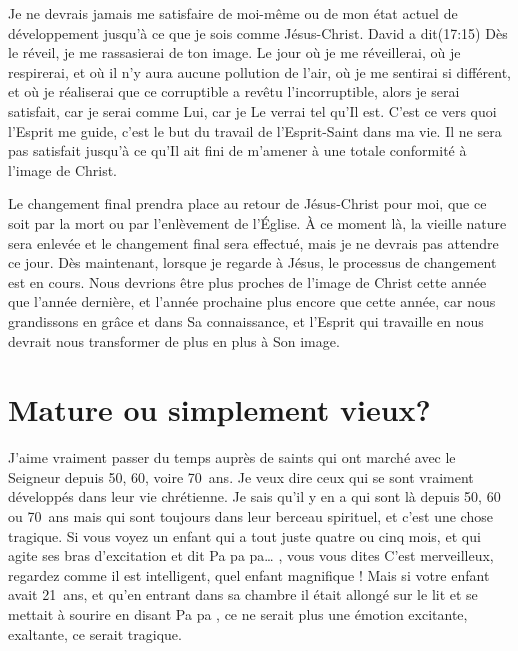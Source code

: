Je ne devrais jamais me satisfaire de moi-même ou de mon état actuel
 de développement jusqu'à ce que je sois comme Jésus-Christ.
 David a dit\frcolon{}(17:15)
 \Og Dès le réveil, je me rassasierai de ton image. \Fg{}
 Le jour où je me réveillerai, où je respirerai,
 et où il n'y aura aucune pollution de l'air, où je me sentirai si différent,
 et où je réaliserai que ce corruptible a revêtu l'incorruptible,
 alors je serai satisfait, car je serai comme Lui, car je Le verrai
 tel qu'Il est. C'est ce vers quoi l'Esprit me guide,
 c'est le but du travail de l'Esprit-Saint dans ma vie.
 Il ne sera pas satisfait jusqu'à ce qu'Il ait fini de m'amener
 à une totale conformité à l'image de Christ.

Le changement final prendra place au retour de Jésus-Christ pour moi,
 que ce soit par la mort ou par l'enlèvement de l'Église.
 À ce moment là, la vieille nature sera enlevée et le changement final
 sera effectué, mais je ne devrais pas attendre ce jour.
 Dès maintenant, lorsque je regarde à Jésus, le processus de changement
 est en cours. Nous devrions être plus proches de l'image de Christ
 cette année que l'année dernière, et l'année prochaine plus encore
 que cette année, car nous grandissons en grâce et dans Sa connaissance,
 et l'Esprit qui travaille en nous devrait nous transformer
 de plus en plus à Son image.


\section{Mature ou simplement vieux?}

J'aime vraiment passer du temps auprès de saints
 qui ont marché avec le Seigneur depuis 50, 60, voire 70~ans.
 Je veux dire ceux qui se sont vraiment développés dans leur vie chrétienne.
 Je sais qu'il y en a qui sont là depuis 50, 60 ou 70~ans mais qui sont
 toujours dans leur berceau spirituel, et c'est une chose tragique.
 Si vous voyez un enfant qui a tout juste quatre ou cinq mois,
 et qui agite ses bras d'excitation et dit\frcolon{}
 \Og Pa pa pa\dots{} \Fg{}, vous vous dites\frcolon{}
 \Og C'est merveilleux, regardez comme il est intelligent,
 quel enfant magnifique ! \Fg{}
 Mais si votre enfant avait 21~ans, et qu'en entrant dans sa chambre
 il était allongé sur le lit et se mettait à sourire en disant\frcolon{}
 \Og Pa pa \Fg{}, ce ne serait plus une émotion excitante, exaltante,
 ce serait tragique.

